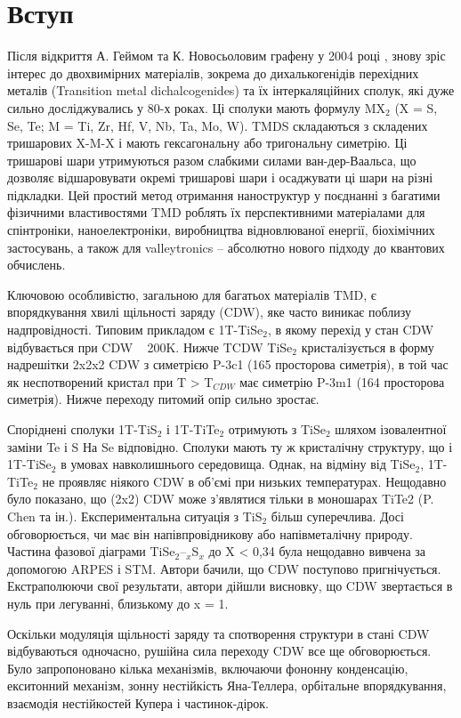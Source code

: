 \chapter{Вступ}
Після відкриття А. Геймом та К. Новосьоловим графену у 2004 році \cite{Graphene}, знову зріс інтерес до двохвимірних матеріалів, зокрема до дихалькогенідів перехідних металів (Transition metal dichalcogenides) та їх інтеркаляційних сполук, які дуже сильно досліджувались у 80-х роках. Ці сполуки мають формулу MX$_{2}$ (X = S, Se, Te; M = Ti, Zr, Hf, V, Nb, Ta, Mo, W). TMDS складаються з складених тришарових X-M-X і мають гексагональну або тригональну симетрію. Ці тришарові шари утримуються разом слабкими силами ван-дер-Ваальса, що дозволяє відшаровувати окремі тришарові шари і осаджувати ці шари на різні підкладки. Цей простий метод отримання наноструктур у поєднанні з багатими фізичними властивостями TMD роблять їх перспективними матеріалами для спінтроніки, наноелектроніки, виробництва відновлюваної енергії, біохімічних застосувань, а також для valleytronics – абсолютно нового підходу до квантових обчислень.

Ключовою особливістю, загальною для багатьох матеріалів TMD, є впорядкування хвилі щільності заряду (CDW), яке часто виникає поблизу надпровідності. Типовим прикладом є 1T-TiSe$_2$, в якому перехід у стан CDW відбувається при CDW ~ 200K. Нижче TCDW TiSe$_2$ кристалізується в форму надрешітки 2x2x2 CDW з симетрією P-3c1 (165 просторова симетрія), в той час як неспотворений кристал при T > T$_{CDW}$ має симетрію P-3m1 (164 просторова симетрія). Нижче переходу питомий опір сильно зростає.

Споріднені сполуки 1T-TiS$_2$ і 1T-TiTe$_2$ отримують з TiSe$_2$ шляхом ізовалентної заміни Te і S На Se відповідно. Сполуки мають ту ж кристалічну структуру, що і 1T-TiSe$_2$ в умовах навколишнього середовища. Однак, на відміну від TiSe$_2$, 1T-TiTe$_2$ не проявляє ніякого CDW в об'ємі при низьких температурах. Нещодавно було показано, що (2x2) CDW може з'являтися тільки в моношарах TiTe2 (P. Chen та ін.). Експериментальна ситуація з TiS$_2$ більш суперечлива. Досі обговорюється, чи має він напівпровідникову або напівметалічну природу. Частина фазової діаграми TiSe$_2$--$_x$S$_x$ до X < 0,34 була нещодавно вивчена за допомогою ARPES і STM. Автори бачили, що CDW поступово пригнічується. Екстраполюючи свої результати, автори дійшли висновку, що CDW звертається в нуль при легуванні, близькому до x = 1.

Оскільки модуляція щільності заряду та спотворення структури в стані CDW відбуваються одночасно, рушійна сила переходу CDW все ще обговорюється. Було запропоновано кілька механізмів, включаючи фононну конденсацію, екситонний механізм, зонну нестійкість Яна-Теллера, орбітальне впорядкування, взаємодія нестійкостей Купера і частинок-дірок.


